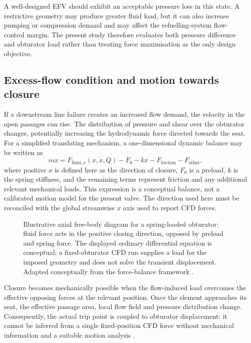 A well-designed EFV should exhibit an acceptable pressure loss in this state. A restrictive geometry may produce greater fluid load, but it can also increase pumping or compression demand and may affect the refuelling-system flow-control margin. The present study therefore evaluates both pressure difference and obturator load rather than treating force maximisation as the only design objective.

\subsection{Excess-flow condition and motion towards closure}

If a downstream line failure creates an increased flow demand, the velocity in the open passages can rise. The distribution of pressure and shear over the obturator changes, potentially increasing the hydrodynamic force directed towards the seat. For a simplified translating mechanism, a one-dimensional dynamic balance may be written as
\begin{equation}
m\ddot{x}=
F_{\mathrm{fluid},x}(x,\dot{x},Q)
-F_0-kx-F_{\mathrm{friction}}-F_{\mathrm{other}},
\label{eq:efv_force_balance}
\end{equation}
where positive $x$ is defined here as the direction of closure, $F_0$ is a preload, $k$ is the spring stiffness, and the remaining terms represent friction and any additional relevant mechanical loads. This expression is a conceptual balance, not a calibrated motion model for the present valve. The direction used here must be reconciled with the global streamwise $x$ axis used to report CFD forces.


\begin{figure}[htbp]
\centering
\resizebox{0.83\textwidth}{!}{}
\caption{Illustrative axial free-body diagram for a spring-loaded obturator: fluid force acts in the positive closing direction, opposed by preload and spring force. The displayed ordinary differential equation is conceptual; a fixed-obturator CFD run supplies a load for the imposed geometry and does not solve the transient displacement. Adapted conceptually from the force-balance framework \cite{white2016,moukalled2016}.}
\label{fig:efv_force_balance}
\end{figure}

Closure becomes mechanically possible when the flow-induced load overcomes the effective opposing forces at the relevant position. Once the element approaches its seat, the effective passage area, local flow field and pressure distribution change. Consequently, the actual trip point is coupled to obturator displacement: it cannot be inferred from a single fixed-position CFD force without mechanical information and a suitable motion analysis \cite{white2016,moukalled2016}.

